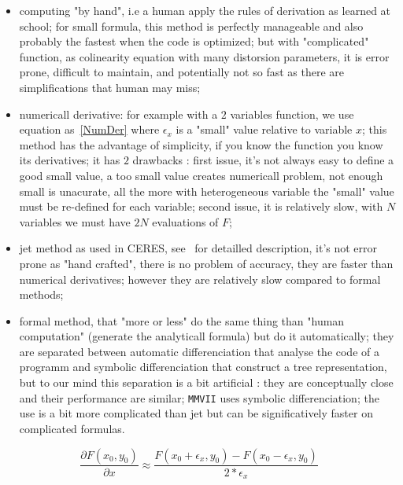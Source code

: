 \begin{itemize}
    \item  computing "by hand", i.e a human apply the rules of derivation as
           learned at school;  for small formula, this method is perfectly manageable 
           and also probably the fastest when the code is optimized;
           but with "complicated" function, as colinearity equation with many distorsion parameters,
           it is error prone, difficult to maintain, and potentially not so fast as there
           are simplifications that human may miss;

    \item  numericall derivative: for example with a $2$ variables function, we use equation as~\ref{NumDer}
           where $\epsilon_x$ is a "small" value relative to variable $x$;
           this method has the advantage of simplicity, if you know the function you know its derivatives;
           it has $2$ drawbacks :  first issue, it's not always easy to define a good small value, a too small value
           creates numericall problem, not enough small is unacurate, all the more with heterogeneous variable the "small"
            value must be re-defined for each variable;  second issue, it is relatively slow, with $N$  variables
           we must have $2N$ evaluations of $F$;

     \item jet method as used in CERES, see~\cite{CERES} for detailled description, it's not error
           prone as "hand crafted", there is no problem of accuracy, they are faster than 
           numerical derivatives; however they are relatively slow compared to formal methods;

   \item formal method, that "more or less" do the same thing than "human computation" (generate the
	   analyticall formula) but do
           it automatically; they are separated between automatic differenciation that analyse the code of a programm
           and symbolic differenciation that construct a tree representation, but to our mind this separation
           is a bit artificial : they are conceptually close and 
           their performance are similar;  {\tt MMVII} uses symbolic differenciation;
           the use is a bit more complicated than jet but can be significatively faster  on complicated
           formulas.
\end{itemize}

\begin{equation}
    \frac{\partial F(x_0,y_0)}{\partial x} \approx \frac{F(x_0 + \epsilon_x,y_0) - F(x_0-\epsilon_x,y_0)}{2* \epsilon_x}
     \label{NumDer}
\end{equation}

